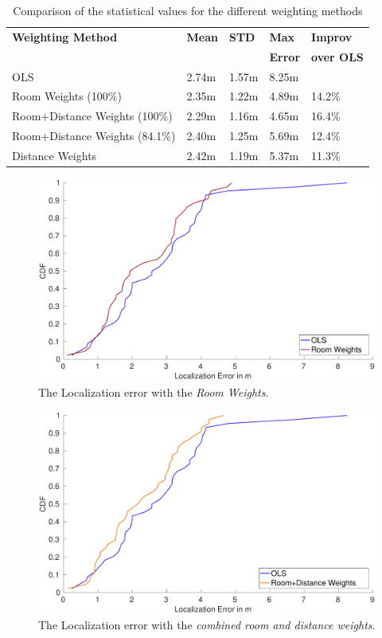 \begin{table}[ht]
\centering
\begin{tabular}{l l l l l}
\toprule
\textbf{Weighting Method}&\textbf{Mean}&\textbf{STD}&\textbf{Max}&\textbf{Improv}\\
&&\textbf{}&\textbf{Error}&\textbf{over OLS}\\
\midrule
OLS&2.74m&1.57m&8.25m&\\
Room Weights (100\%)&2.35m&1.22m&4.89m&14.2\%\\
Room+Distance Weights (100\%)&2.29m&1.16m&4.65m&16.4\%\\
Room+Distance Weights (84.1\%)&2.40m&1.25m&5.69m&12.4\%\\
Distance Weights&2.42m&1.19m&5.37m&11.3\%\\
\bottomrule
\end{tabular}
\caption[Weighting - statistical values]{Comparison of the statistical values for the different weighting methods}
\label{tab:WeightingStatisticalValues}
\end{table}

\begin{figure}[p]
\centering
\includegraphics[width=\textwidth]{Figures/WeightingCDF_RW}
\decoRule
\caption[CDF Room Weights method (best-case)]{The Localization error with the \emph{Room Weights}.}
\label{fig:WeightingCDFRoom}
\end{figure}

\begin{figure}[p]
\centering
\includegraphics[width=\textwidth]{Figures/WeightingCDF_RDW}
\decoRule
\caption[CDF Room+Distance Weights method (best-case)]{The Localization error with the \emph{combined room and distance weights}.}
\label{fig:WeightingCDFRoomDistance}
\end{figure}

